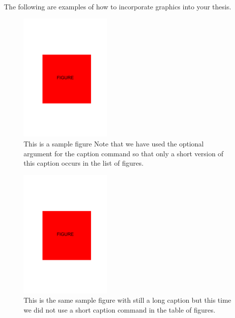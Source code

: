 \documentclass[msc,oneside]{ubcthesis}%
\begin{document}
The following are examples of how to incorporate graphics into your thesis.

\begin{figure}[ht]
  \begin{center}
    \includegraphics[width=0.4\textwidth]{figure}
    \caption[Sample figure.]{\label{fig:happy} This is a sample figure
      Note that we have
      used the optional argument for the caption command so that only
      a short version of this caption occurs in the list of figures.}
  \end{center}
\end{figure}

\begin{figure}[ht]
  \begin{center}
    \includegraphics[width=0.4\textwidth]{figure}
    \caption{\label{fig:happy2} This is the same sample figure with still
			a long caption but this time we did not use a short caption command
			in the table of figures.}
  \end{center}
\end{figure}
\end{document}
